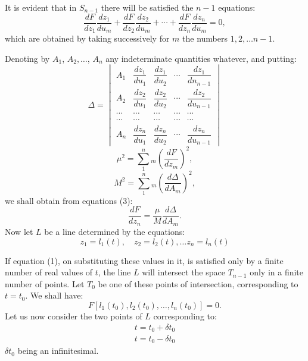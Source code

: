\documentclass{article}
\begin{document}
It is evident that in $S_{n-1}$ there will be satisfied the $n-1$ equations:
\[ \frac{dF}{dz_{1}}\frac{dz_{1}}{du_{m}} + \frac{dF}{dz_{2}}\frac{dz_{2}}{du_{m}} + \cdots + \frac{dF}{dz_{n}}\frac{dz_{n}}{du_{m}} = 0, \tag{3} \]
which are obtained by taking successively for $m$ the numbers $1, 2,\ldots n-1$.

Denoting by $A_{1}$, $A_{2},\ldots$, $A_{n}$ any indeterminate quantities whatever, and putting:
\[
\Delta =
\begin{vmatrix}
A_{1} & \dfrac{dz_{1}}{du_{1}} & \dfrac{dz_{1}}{du_{2}} & \cdots & \dfrac{dz_{1}}{dn_{n-1}}\\[6pt]
A_{2} & \dfrac{dz_{2}}{du_{1}} & \dfrac{dz_{2}}{du_{2}} & \cdots & \dfrac{dz_{2}}{du_{n-1}}\\[6pt]
\cdots & \cdots & \cdots & \cdots & \cdots\\
\cdots & \cdots & \cdots & \cdots & \cdots\\
A_{n} & \dfrac{dz_{n}}{du_{1}} & \dfrac{dz_{n}}{du_{2}} & \cdots & \dfrac{dz_{n}}{du_{n-1}}
\end{vmatrix}
\tag{4}
\]
\[ \mu^{2} = \sum_{1}^{n}{}_{m}\left(\frac{dF}{dz_{m}}\right)^{2}, \tag{5} \]
\[ M^{2} = \sum_{1}^{n}{}_{m}\left(\frac{d\Delta}{dA_{m}}\right)^{2}, \tag{6} \]
we shall obtain from equations (3):
\[ \frac{dF}{dz_{n}} = \frac{\mu}{M}\frac{d\Delta}{dA_{m}}. \tag{7} \]
Now let $L$ be a line determined by the equations:
\[ z_{1} = l_{1}(t), \quad z_{2} = l_{2}(t),\ldots z_{n} = l_{n}(t) \tag{8} \]


If equation (1), on substituting these values in it, is satisfied only by a finite number of real values of $t$, the line $L$ will intersect the space $T_{n-1}$ only in a finite number of points. Let $T_{0}$ be one of these points of intersection, corresponding to $t = t_{0}$. We shall have:
\[ F[l_{1}(t_{0}), l_{2}(t_{0}),\ldots, l_{n}(t_{0})] = 0. \]
Let us now consider the two points of $L$ corresponding to:
\[
\begin{gathered}
t = t_{0} + \delta t_{0}\\
t = t_{0} - \delta t_{0}
\end{gathered}
\]
$\delta t_{0}$ being an infinitesimal.
\end{document}
